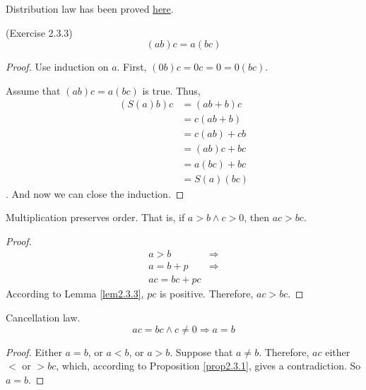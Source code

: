 Distribution law has been proved \hyperref[distriLaw]{here}.

\begin{prop}
(Exercise 2.3.3) \label{exercise2.3.3}
\[
(ab)c = a(bc)
\]
\end{prop}
\begin{proof}
Use induction on $a$.
First, $(0b)c=0c=0=0(bc)$.

Assume that $(ab)c = a(bc)$ is true. Thus, 
\begin{align*}
(S(a)b)c
&= (ab+b)c \\
&= c(ab+b) \tag{Commutativity} \\
&= c(ab) + cb \tag{Distribution law} \\
&= (ab)c + bc \tag{Commutativity} \\
&= a(bc) + bc \tag{The induction hypothesis} \\
&= S(a)(bc)
\end{align*}. And now we can close the induction.
\end{proof}

\begin{prop}
\label{prop2.3.1}
Multiplication preserves order. That is, if $a>b \wedge c>0$, then $ac > bc$.
\end{prop}
\begin{proof}
\begin{align*}
a>b 
&\Rightarrow \\ a = b + p 
&\Rightarrow \\ ac = bc + pc
\end{align*}
According to Lemma \ref{lem2.3.3}, $pc$ is positive. Therefore, $ac>bc$.
\end{proof}

\begin{coro}
Cancellation law. 
\[
ac=bc \wedge c \neq 0 \Rightarrow a=b
\]
\end{coro}
\begin{proof}
Either $a=b$, or $a<b$, or $a>b$. Suppose that $a \neq b$. Therefore, $ac$ either $<$ or $>bc$, which, 
according to Proposition \ref{prop2.3.1}, gives a contradiction. So $a=b$.
\end{proof}

